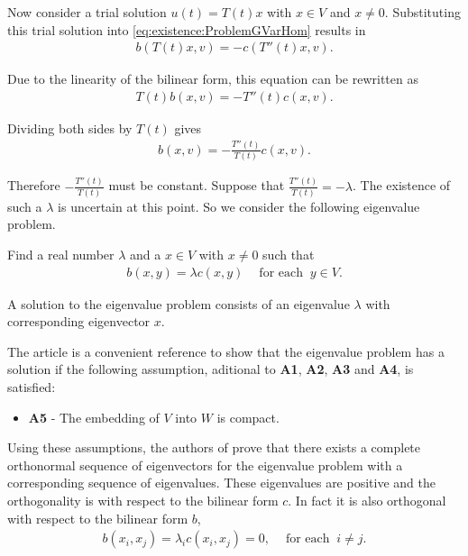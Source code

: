 		Now consider a trial solution $u(t) = T(t)x$ with $x \in V$ and $x \neq 0$. Substituting this trial solution into \eqref{eq:existence:ProblemGVarHom} results in
		\begin{eqnarray*}
			b(T(t)x,v) = - c(T''(t)x,v).  \label{eq:existence:ProblemGVarHom:Substitution}
		\end{eqnarray*}

		Due to the linearity of the bilinear form, this equation can be rewritten as
		\begin{eqnarray*}
			T(t)b(x,v) = - T''(t)c(x,v).
		\end{eqnarray*}

		Dividing both sides by $T(t)$ gives
		\begin{eqnarray*}
			b(x,v) = - \frac{T''(t)}{T(t)}c(x,v).
		\end{eqnarray*}

		Therefore $\displaystyle -\frac{T''(t)}{T(t)}$ must be constant. Suppose that $\displaystyle \frac{T''(t)}{T(t)} = -\lambda$. The existence of such a $\lambda$ is uncertain at this point. So we consider the following eigenvalue problem.

		Find a real number $\lambda$ and a $x \in V$ with $x \neq 0$ such that
		\begin{eqnarray*}
			b(x,y) = \lambda c(x,y) \ \ \ \ \textrm{ for each } \ y \in V.
		\end{eqnarray*}

		A solution to the eigenvalue problem consists of an eigenvalue $\lambda$ with corresponding eigenvector $x$. 

		The article \cite{CVV18} is a convenient reference to show that the eigenvalue problem has a solution if the following assumption, aditional to \textbf{A1}, \textbf{A2}, \textbf{A3} and \textbf{A4},  is satisfied:

		\begin{itemize}
			\item[] \textbf{A5} - The embedding of $V$ into $W$ is compact.
		\end{itemize}


		Using these assumptions, the authors of \cite{CVV18} prove that there exists a complete orthonormal sequence of eigenvectors for the eigenvalue problem with a corresponding sequence of eigenvalues. These eigenvalues are positive and the orthogonality is with respect to the bilinear form $c$. In fact it is also orthogonal with respect to the bilinear form $b$,
		\begin{eqnarray*}
			b(x_i, x_j) = \lambda_i c(x_i, x_j) = 0, \ \ \ \ \textrm{ for each } \ i \neq j.
		\end{eqnarray*}

